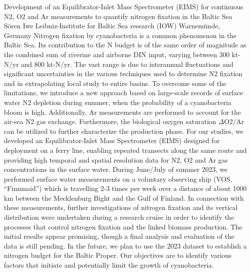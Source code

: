 \begin{conf-abstract}
{Development of an Equilibrator-Inlet Mass Spectrometer (EIMS) for continuous N2, O2 and Ar measurements to quantify nitrogen fixation in the Baltic Sea}
{Sören Iwe}
{Leibniz-Institute for Baltic Sea research (IOW) Warnemünde, Germany}
{Nitrogen fixation by cyanobacteria is a common phenomenon in the Baltic Sea. Its contribution to the N budget is of the same order of magnitude as the combined sum of riverine and airborne DIN input, varying between 300 kt-N/yr and 800 kt-N/yr. The vast range is due to interannual fluctuations and significant uncertainties in the various techniques used to determine N2 fixation and in extrapolating local study to entire basins. To overcome some of the limitations, we introduce a new approach based on large-scale records of surface water N2 depletion during summer, when the probability of a cyanobacteria bloom is high. Additionally, Ar measurements are performed to account for the air-sea N2 gas exchange. Furthermore, the biological oxygen saturation $\Delta$O2/Ar can be utilized to further characterize the production phase. 
For our studies, we developed an Equilibrator-Inlet Mass Spectrometer (EIMS) designed for deployment on a ferry line, enabling repeated transects along the same route and providing high temporal and spatial resolution data for N2, O2 and Ar gas concentrations in the surface water. During June/July of summer 2023, we performed surface water measurements on a voluntary observing ship (VOS, “Finnmaid”) which is travelling 2-3 times per week over a distance of about 1000 km between the Mecklenburg Bight and the Gulf of Finland. In connection with these measurements, further investigations of nitrogen fixation and its vertical distribution were undertaken during a research cruise in order to identify the processes that control nitrogen fixation and the linked biomass production.
The initial results appear promising, though a final analysis and evaluation of the data is still pending. 
In the future, we plan to use the 2023 dataset to establish a nitrogen budget for the Baltic Proper. Our objectives are to identify various factors that initiate and potentially limit the growth of cyanobacteria.}
\end{conf-abstract}
